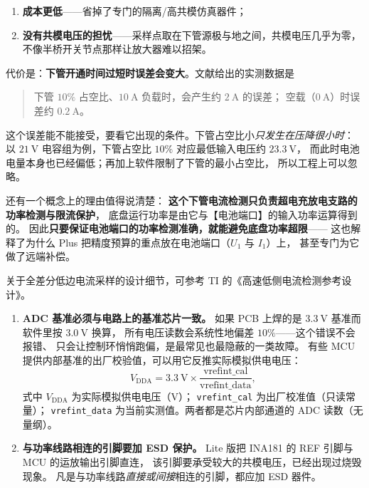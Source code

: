 \documentclass[cn,blue,11pt,device=normal]{elegantnote}
\begin{document}
\begin{enumerate}
  \item \textbf{成本更低}——省掉了专门的隔离/高共模仿真器件；
  \item \textbf{没有共模电压的担忧}——采样点取在下管源极与地之间，共模电压几乎为零，
  不像半桥开关节点那样让放大器难以招架。
\end{enumerate}

代价是：\textbf{下管开通时间过短时误差会变大}。文献给出的实测数据是

\begin{quote}
下管 $10\%$ 占空比、$10\ \mathrm{A}$ 负载时，会产生约 $2\ \mathrm{A}$ 的误差；
空载（$0\ \mathrm{A}$）时误差约 $0.2\ \mathrm{A}$。
\end{quote}

这个误差能不能接受，要看它出现的条件。下管占空比小\emph{只发生在压降很小时}：
以 $21\ \mathrm{V}$ 电容组为例，下管占空比 $10\%$ 对应最低输入电压约 $23.3\ \mathrm{V}$，
而此时电池电量本身也已经偏低；再加上软件限制了下管的最小占空比，
所以工程上可以忽略。

还有一个概念上的理由值得说清楚：
\textbf{这个下管电流检测只负责超电充放电支路的功率检测与限流保护}，
底盘运行功率是由它与【电池端口】的输入功率运算得到的。
因此\textbf{只要保证电池端口的功率检测准确，就能避免底盘功率超限}——
这也解释了为什么 Plus 把精度预算的重点放在电池端口（$U_1$ 与 $I_1$）上，
甚至专门为它做了远端补偿。

关于全差分低边电流采样的设计细节，可参考 TI 的《高速低侧电流检测参考设计》。

\begin{note}[两条很容易踩的采样坑]
\begin{enumerate}
  \item \textbf{ADC 基准必须与电路上的基准芯片一致。}
  如果 PCB 上焊的是 $3.3\ \mathrm{V}$ 基准而软件里按 $3.0\ \mathrm{V}$ 换算，
  所有电压读数会系统性地偏差 $10\%$——这个错误不会报错、
  只会让控制环悄悄跑偏，是最常见也最隐蔽的一类故障。
  有些 MCU 提供内部基准的出厂校验值，可以用它反推实际模拟供电电压：
  \begin{equation}\label{eq:vrefcal}
    V_{\mathrm{DDA}} = 3.3\ \mathrm{V}\times\frac{\text{vrefint\_cal}}{\text{vrefint\_data}} ,
  \end{equation}
  式中 $V_{\mathrm{DDA}}$ 为实际模拟供电电压（V）；
  \texttt{vrefint\_\allowbreak{}cal} 为出厂校准值（只读常量）；
  \texttt{vrefint\_\allowbreak{}data} 为当前实测值。两者都是芯片内部通道的 ADC 读数（无量纲）。
  \item \textbf{与功率线路相连的引脚要加 ESD 保护。}
  Lite 版把 INA181 的 REF 引脚与 MCU 的运放输出引脚直连，
  该引脚要承受较大的共模电压，已经出现过烧毁现象。
  凡是与功率线路\emph{直接或间接}相连的引脚，都应加 ESD 器件。
\end{enumerate}
\end{note}
\end{document}
